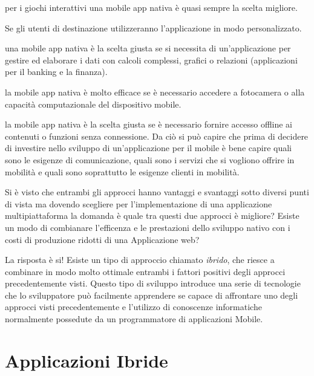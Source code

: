 \begin{description}
    \begin{description}[style=unboxed,leftmargin=0cm]
        \item[Advergaming] per i giochi interattivi una mobile app nativa è quasi sempre la scelta migliore.
        \item[Personalizzazione] Se gli utenti di destinazione utilizzeranno l'applicazione in modo personalizzato.
        \item[Maggiore capacità di calcolo  e reporting] una mobile app nativa è la scelta giusta se si necessita di un'applicazione per gestire ed elaborare i dati con calcoli complessi, grafici o relazioni (applicazioni per il banking e la finanza).
        \item[Funzionalità native] la mobile app nativa è molto efficace  se è necessario accedere a fotocamera o alla capacità computazionale del dispositivo mobile.
        \item[Nessun collegamento richiesto]la mobile app nativa è la scelta giusta se è necessario fornire accesso offline ai contenuti o funzioni senza connessione. Da ciò si può capire che prima di decidere di investire nello sviluppo di un'applicazione per il mobile è bene capire quali sono le esigenze di comunicazione, quali sono i servizi che si vogliono offrire in mobilità e quali sono soprattutto le esigenze clienti in mobilità.
    \end{description}
\end{description}

Si è visto che entrambi gli approcci hanno vantaggi e svantaggi sotto diversi punti di vista ma dovendo scegliere per l'implementazione di una applicazione multipiattaforma la domanda è quale tra questi due approcci è migliore? Esiste un modo di combianare l'efficenza e le prestazioni dello sviluppo nativo con i costi di produzione ridotti di una Applicazione web?

La risposta è si! Esiste un tipo di approccio chiamato \emph{ibrido}, che riesce a combinare in modo molto ottimale entrambi i fattori positivi degli approcci precedentemente visti. Questo tipo di sviluppo introduce una serie di tecnologie che lo sviluppatore può facilmente apprendere se capace di affrontare uno degli approcci visti precedentemente e l'utilizzo di conoscenze informatiche normalmente possedute da un programmatore di applicazioni Mobile.
\section{Applicazioni Ibride}
\label{sec:hybridApp}

